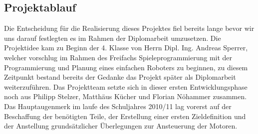 \subsection{Projektablauf}
Die Entscheidung für die Realisierung dieses Projektes fiel bereits lange bevor wir uns darauf festlegten es im Rahmen der Diplomarbeit umzusetzen. Die Projektidee kam zu Beginn der 4. Klasse von Herrn Dipl. Ing. Andreas Sperrer, welcher vorschlug im Rahmen des Freifachs Spieleprogrammierung mit der Programmierung und Planung eines einfachen Roboters zu beginnen, zu diesem Zeitpunkt bestand bereits der Gedanke das Projekt später als Diplomarbeit weiterzuführen. Das Projektteam setzte sich in dieser ersten Entwicklungsphase noch aus Philipp Stelzer, Matthäus Kücher und Florian Nöhammer zusammen. Das Hauptaugenmerk im laufe des Schuljahres 2010/11 lag vorerst auf der Beschaffung der benötigten Teile, der Erstellung einer ersten Zieldefinition und der Anstellung grundsätzlicher Überlegungen zur Ansteuerung der Motoren.\\

